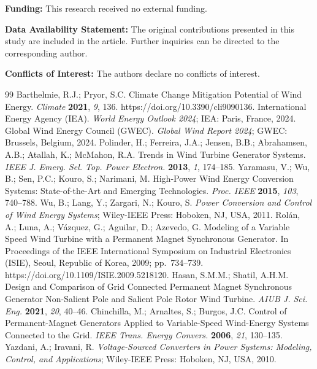 \documentclass[11pt,a4paper]{article}
\begin{document}
\noindent\textbf{Funding:} This research received no external funding.

\noindent\textbf{Data Availability Statement:} The original contributions presented in this study are
included in the article. Further inquiries can be directed to the corresponding author.

\noindent\textbf{Conflicts of Interest:} The authors declare no conflicts of interest.
\normalsize

\begin{thebibliography}{99}
\small
{} Barthelmie, R.J.; Pryor, S.C. Climate Change Mitigation Potential of Wind Energy.
\emph{Climate} \textbf{2021}, \emph{9}, 136. https://doi.org/10.3390/cli9090136.
 International Energy Agency (IEA). \emph{World Energy Outlook 2024}; IEA: Paris, France, 2024.
 Global Wind Energy Council (GWEC). \emph{Global Wind Report 2024}; GWEC: Brussels,
Belgium, 2024.
 Polinder, H.; Ferreira, J.A.; Jensen, B.B.; Abrahamsen, A.B.; Atallah, K.;
McMahon, R.A. Trends in Wind Turbine Generator Systems. \emph{IEEE J. Emerg. Sel. Top. Power Electron.}
\textbf{2013}, \emph{1}, 174--185.
 Yaramasu, V.; Wu, B.; Sen, P.C.; Kouro, S.; Narimani, M. High-Power Wind Energy
Conversion Systems: State-of-the-Art and Emerging Technologies. \emph{Proc. IEEE} \textbf{2015},
\emph{103}, 740--788.
 Wu, B.; Lang, Y.; Zargari, N.; Kouro, S. \emph{Power Conversion and Control of Wind
Energy Systems}; Wiley-IEEE Press: Hoboken, NJ, USA, 2011.
 Rol\'an, A.; Luna, A.; V\'azquez, G.; Aguilar, D.; Azevedo, G. Modeling of a
Variable Speed Wind Turbine with a Permanent Magnet Synchronous Generator. In Proceedings of the IEEE
International Symposium on Industrial Electronics (ISIE), Seoul, Republic of Korea, 2009; pp.~734--739.
https://doi.org/10.1109/ISIE.2009.5218120.
 Hasan, S.M.M.; Shatil, A.H.M. Design and Comparison of Grid Connected Permanent
Magnet Synchronous Generator Non-Salient Pole and Salient Pole Rotor Wind Turbine. \emph{AIUB J. Sci.
Eng.} \textbf{2021}, \emph{20}, 40--46.
 Chinchilla, M.; Arnaltes, S.; Burgos, J.C. Control of Permanent-Magnet
Generators Applied to Variable-Speed Wind-Energy Systems Connected to the Grid. \emph{IEEE Trans. Energy
Convers.} \textbf{2006}, \emph{21}, 130--135.
 Yazdani, A.; Iravani, R. \emph{Voltage-Sourced Converters in Power Systems:
Modeling, Control, and Applications}; Wiley-IEEE Press: Hoboken, NJ, USA, 2010.

\end{thebibliography}
\end{document}
